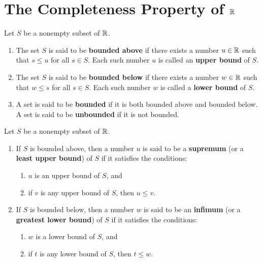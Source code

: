 \section{The Completeness Property of $\mathbb{R}$}

\begin{definition}
	Let $S$ be a nonempty subset of $\mathbb{R}$.
	\begin{enumerate}
		\item The set $S$ is said to be \textbf{bounded above} if there exists a number $u \in \mathbb{R}$ such that $s \leq u$ for all $s \in S$. Each such number $u$ is called an \textbf{upper bound} of $S$.

		\item The set $S$ is said to be \textbf{bounded below} if there exists a number $w \in \mathbb{R}$ such that $w \leq s$ for all $s \in S$. Each such number $w$ is called a \textbf{lower bound} of $S$.

		\item A set is said to be \textbf{bounded} if it is both bounded above and bounded below. A set is said to be \textbf{unbounded} if it is not bounded.
	\end{enumerate}
\end{definition}

\begin{definition}
	Let $S$ be a nonempty subset of $\mathbb{R}$.
	\begin{enumerate}
		\item If $S$ is bounded above, then a number $u$ is said to be a \textbf{supremum} (or a \textbf{least upper bound}) of $S$ if it satisfies the conditions:
		      \begin{enumerate}
			      \item $u$ is an upper bound of $S$, and
			      \item if $v$ is any upper bound of $S$, then $u \leq v$.
		      \end{enumerate}

		\item If $S$ is bounded below, then a number $w$ is said to be an \textbf{infimum} (or a \textbf{greatest lower bound}) of $S$ if it satisfies the conditions:
		      \begin{enumerate}
			      \item $w$ is a lower bound of $S$, and
			      \item if $t$ is any lower bound of $S$, then $t \leq w$.
		      \end{enumerate}
	\end{enumerate}
\end{definition}


